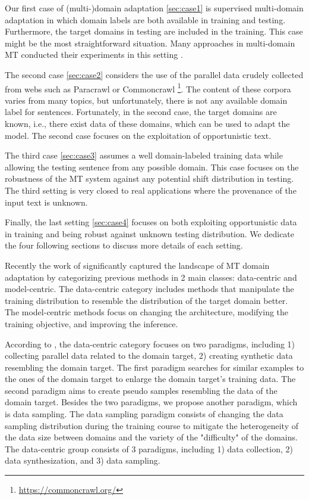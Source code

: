Our first case of (multi-)domain adaptation \ref{sec:case1} is supervised multi-domain adaptation in which domain labels are both available in training and testing. Furthermore, the target domains in testing are included in the training. This case might be the most straightforward situation. Many approaches in multi-domain MT conducted their experiments in this setting \citep{Pham21revisiting}. 

The second case \ref{sec:case2} considers the use of the parallel data crudely collected from webs such as Paracrawl \citep{Banon20Paracrawl} or Commoncrawl \footnote{\url{https://commoncrawl.org/}}. The content of these corpora varies from many topics, but unfortunately, there is not any available domain label for sentences. Fortunately, in the second case, the target domains are known, i.e., there exist data of these domains, which can be used to adapt the model. The second case focuses on the exploitation of opportunistic text. 

The third case \ref{sec:case3} assumes a well domain-labeled training data while allowing the testing sentence from any possible domain. This case focuses on the robustness of the MT system against any potential shift distribution in testing. The third setting is very closed to real applications where the provenance of the input text is unknown. 

Finally, the last setting \ref{sec:case4} focuses on both exploiting opportunistic data in training and being robust against unknown testing distribution. We dedicate the four following sections to discuss more details of each setting.

Recently the work of \citet{Chu18survey} significantly captured the landscape of MT domain adaptation by categorizing previous methods in 2 main classes: data-centric and model-centric. The data-centric category includes methods that manipulate the training distribution to resemble the distribution of the target domain better. The model-centric methods focus on changing the architecture, modifying the training objective, and improving the inference.

According to \citet{Chu18asurvey}, the data-centric category focuses on two paradigms, including 1) collecting parallel data related to the domain target, 2) creating synthetic data resembling the domain target. The first paradigm searches for similar examples to the ones of the domain target to enlarge the domain target's training data. The second paradigm aims to create pseudo samples resembling the data of the domain target. Besides the two paradigms, we propose another paradigm, which is data sampling. The data sampling paradigm consists of changing the data sampling distribution during the training course to mitigate the heterogeneity of the data size between domains and the variety of the "difficulty" of the domains. The data-centric group consists of 3 paradigms, including 1) data collection, 2) data synthesization, and 3) data sampling.

